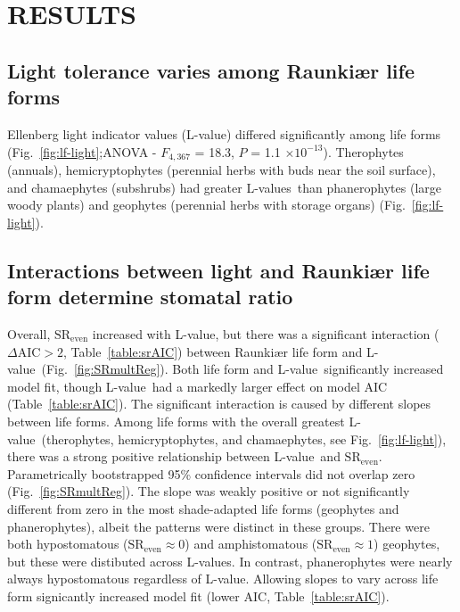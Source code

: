 \documentclass[12pt, oneside]{article}
\newcommand{\el}{L-value}
\newcommand{\els}{L-values}
\begin{document}

\section*{RESULTS}

\subsection*{Light tolerance varies among Raunki\ae r life forms}

Ellenberg light indicator values (\el) differed significantly among life forms (Fig.~\ref{fig:lf-light};ANOVA - $F_{4, 367}$ = 18.3, $P$ = 1.1 $\times10^{-13}$). Therophytes (annuals), hemicryptophytes (perennial herbs with buds near the soil surface), and chamaephytes (subshrubs) had greater \els~than phanerophytes (large woody plants) and geophytes (perennial herbs with storage organs) (Fig.~\ref{fig:lf-light}).

\subsection*{Interactions between light and Raunki\ae r life form determine stomatal ratio}

Overall, $\mathrm{SR_{even}}$ increased with \el, but there was a significant interaction ($\Delta\mathrm{AIC} > 2$, Table~\ref{table:srAIC}) between Raunki\ae r life form and \el~(Fig.~\ref{fig:SRmultReg}). Both life form and \el~significantly increased model fit, though \el~had a markedly larger effect on model AIC (Table~\ref{table:srAIC}). The significant interaction is caused by different slopes between life forms. Among life forms with the overall greatest \el~(therophytes, hemicryptophytes, and chamaephytes, see Fig.~\ref{fig:lf-light}), there was a strong positive relationship between \el~and $\mathrm{SR_{even}}$. Parametrically bootstrapped 95\% confidence intervals did not overlap zero (Fig.~\ref{fig:SRmultReg}). The slope was weakly positive or not significantly different from zero in the most shade-adapted life forms (geophytes and phanerophytes), albeit the patterns were distinct in these groups. There were both hypostomatous ($\mathrm{SR_{even}} \approx 0$) and amphistomatous ($\mathrm{SR_{even}} \approx 1$) geophytes, but these were distibuted across \el s. In contrast, phanerophytes were nearly always hypostomatous regardless of \el. Allowing slopes to vary across life form signicantly increased model fit (lower AIC, Table~\ref{table:srAIC}).
\end{document}
